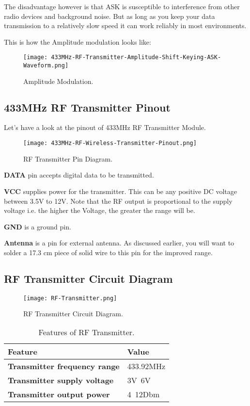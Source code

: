 The disadvantage however is that ASK is susceptible to interference from other radio devices and background noise. But as long as you keep your data transmission to a relatively slow speed it can work reliably in most environments.\vspace{.3cm}

This is how the Amplitude modulation looks like:

\begin{figure}[h]
	\centering
	\texttt{[image: 433MHz-RF-Transmitter-Amplitude-Shift-Keying-ASK-Waveform.png]}
	\caption{Amplitude Modulation.}
\end{figure}

\subsection{433MHz RF Transmitter Pinout}
Let’s have a look at the pinout of 433MHz RF Transmitter Module.
\begin{figure}[h]
	\centering
	\texttt{[image: 433MHz-RF-Wireless-Transmitter-Pinout.png]}
	\caption{RF Transmitter Pin Diagram.}
\end{figure}
\textbf{DATA }pin accepts digital data to be transmitted.

\textbf{VCC }supplies power for the transmitter. This can be any positive DC voltage between 3.5V to 12V. Note that the RF output is proportional to the supply voltage i.e. the higher the Voltage, the greater the range will be.

\textbf{GND} is a ground pin.

\textbf{Antenna} is a pin for external antenna. As discussed earlier, you will want to solder a 17.3 cm piece of solid wire to this pin for the improved range.

\pagebreak
\subsection{RF Transmitter Circuit Diagram}
\begin{figure}[h]
	\centering
	\texttt{[image: RF-Transmitter.png]}
	\caption{RF Transmitter Circuit Diagram.}
\end{figure}


\begin{table}[h]
	\begin{center}
		
		\begin{tabular}{l|l} 
			\textbf{Feature} & \textbf{Value} \\
			\hline
			\textbf{Transmitter frequency range} & 433.92MHz\\
			\textbf{Transmitter supply voltage}	& 3V~6V\\
			\textbf{Transmitter output power} &	4~12Dbm\\
			
			
		\end{tabular}\caption{Features of RF Transmitter.}
	\end{center}
\end{table}

